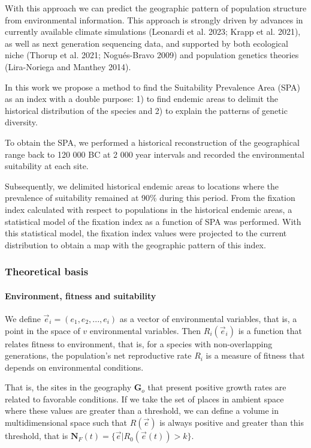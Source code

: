 \documentclass[
]{article}
\begin{document}
With this approach we can predict the geographic pattern of population
structure from environmental information. This approach is strongly
driven by advances in currently available climate simulations (Leonardi
et al. 2023; Krapp et al. 2021), as well as next generation sequencing
data, and supported by both ecological niche (Thorup et al. 2021;
Nogués-Bravo 2009) and population genetics theories (Lira-Noriega and
Manthey 2014).

In this work we propose a method to find the Suitability Prevalence Area
(SPA) as an index with a double purpose: 1) to find endemic areas to
delimit the historical distribution of the species and 2) to explain the
patterns of genetic diversity.

To obtain the SPA, we performed a historical reconstruction of the
geographical range back to 120 000 BC at 2 000 year intervals and
recorded the environmental suitability at each site.

Subsequently, we delimited historical endemic areas to locations where
the prevalence of suitability remained at 90\% during this period. From
the fixation index calculated with respect to populations in the
historical endemic areas, a statistical model of the fixation index as a
function of SPA was performed. With this statistical model, the fixation
index values were projected to the current distribution to obtain a map
with the geographic pattern of this index.

\hypertarget{theoretical-basis}{%
\subsubsection{Theoretical basis}\label{theoretical-basis}}

\hypertarget{environment-fitness-and-suitability}{%
\paragraph{Environment, fitness and
suitability}\label{environment-fitness-and-suitability}}

We define \(\vec{e}_i =(e_1, e_2, ..., e_i )\) as a vector of
environmental variables, that is, a point in the space of \(v\)
environmental variables. Then \(R_i(\vec{e}_i)\) is a function that
relates fitness to environment, that is, for a species with
non-overlapping generations, the population's net reproductive rate
\(R_i\) is a measure of fitness that depends on environmental
conditions.

That is, the sites in the geography \(\mathbf{G}_o\) that present
positive growth rates are related to favorable conditions. If we take
the set of places in ambient space where these values are greater than a
threshold, we can define a volume in multidimensional space such that
\(R(\vec{e})\) is always positive and greater than this threshold, that
is \(\mathbf{N}_F(t) = \{\vec{e} | R_0(\vec{e}(t)) > k \}\).
\end{document}
